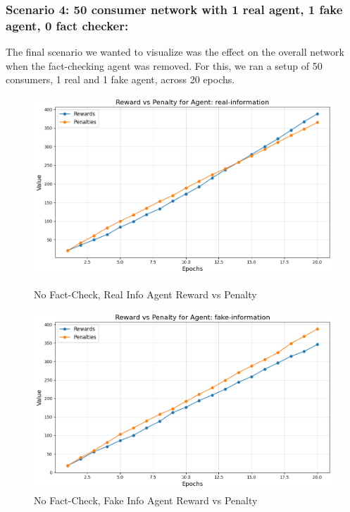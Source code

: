 \documentclass[twoside]{article}
\begin{document}
 \pagebreak
\subsubsection{Scenario 4: 50 consumer network with 1 real agent, 1 fake agent, 0 fact checker:}

The final scenario we wanted to visualize was the effect on the overall network when the fact-checking agent was removed. For this, we ran a setup of 50 consumers, 1 real and 1 fake agent, across 20 epochs.

\begin{figure}[htbp]
     \centering
     \begin{minipage}[b]{0.45\textwidth}
         \centering
         \includegraphics[width=\textwidth]{../results/no_fact_checker/real.png}
         \caption{No Fact-Check, Real Info Agent Reward vs Penalty}
         \label{fig: real agent, no fact}
     \end{minipage}
     \hfill
     \begin{minipage}[b]{0.45\textwidth}
         \centering
         \includegraphics[width=\textwidth]{../results/no_fact_checker/fake.png}
         \caption{No Fact-Check, Fake Info Agent Reward vs Penalty}
         \label{fig: fake agent, no fact}
     \end{minipage}
 \end{figure}
\end{document}
